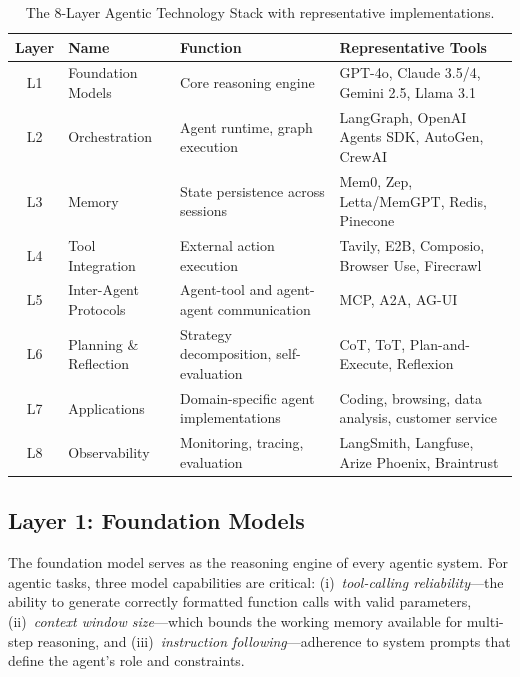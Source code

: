 \documentclass[12pt, a4paper]{article}
\begin{document}
\begin{table}[ht]
\centering
\caption{The 8-Layer Agentic Technology Stack with representative implementations.}
\label{tab:stack}
\begin{tabular}{clll}
\toprule
\textbf{Layer} & \textbf{Name} & \textbf{Function} & \textbf{Representative Tools} \\
\midrule
L1 & Foundation Models    & Core reasoning engine                    & GPT-4o, Claude 3.5/4, Gemini 2.5, Llama 3.1 \\
L2 & Orchestration        & Agent runtime, graph execution            & LangGraph, OpenAI Agents SDK, AutoGen, CrewAI \\
L3 & Memory               & State persistence across sessions         & Mem0, Zep, Letta/MemGPT, Redis, Pinecone \\
L4 & Tool Integration     & External action execution                 & Tavily, E2B, Composio, Browser Use, Firecrawl \\
L5 & Inter-Agent Protocols & Agent-tool and agent-agent communication & MCP, A2A, AG-UI \\
L6 & Planning \& Reflection & Strategy decomposition, self-evaluation & CoT, ToT, Plan-and-Execute, Reflexion \\
L7 & Applications         & Domain-specific agent implementations     & Coding, browsing, data analysis, customer service \\
L8 & Observability        & Monitoring, tracing, evaluation           & LangSmith, Langfuse, Arize Phoenix, Braintrust \\
\bottomrule
\end{tabular}
\end{table}

\subsection{Layer 1: Foundation Models}
The foundation model serves as the reasoning engine of every agentic system. For agentic tasks, three model capabilities are critical: (i)~\emph{tool-calling reliability}---the ability to generate correctly formatted function calls with valid parameters, (ii)~\emph{context window size}---which bounds the working memory available for multi-step reasoning, and (iii)~\emph{instruction following}---adherence to system prompts that define the agent's role and constraints.
\end{document}
